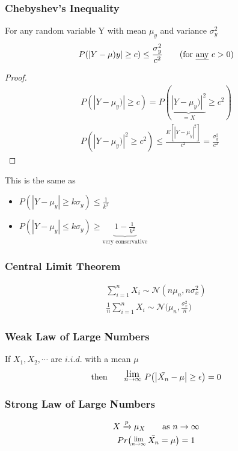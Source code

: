 \subsubsection*{Chebyshev's Inequality}
For any random variable Y with mean $\mu_y$ and variance $\sigma_y^2$
\begin{equation*}
	P(|Y - \mu)y| \geq c) \leq \frac{\sigma_y^2}{c^2} \tag{for \underline{any} $c > 0$}
\end{equation*}
\begin{proof}
	\begin{gather*}
		P(|Y - \mu_y)| \geq c) = P(\underbrace{|Y - \mu_y)|^2}_{=X} \geq c^2)\\
		P(|Y - \mu_y)|^2 \geq c^2) \leq \frac{E[|Y - \mu_y|^2]}{c^2} = \frac{\sigma_y^2}{c^2}
	\end{gather*}
\end{proof}
This is the same as
\begin{itemize}[label={--}]
	\item $P(|Y - \mu_y| \geq k \sigma_y) \leq \frac{1}{k^2}$
	\item $P(|Y - \mu_y| \leq k \sigma_y) \geq \underbrace{1- \frac{1}{k^2}}_{\text{very conservative}}$
\end{itemize}
\subsubsection*{Central Limit Theorem}
\begin{gather*}
	\sum\limits_{i=1}^n X_i \sim \mathcal{N}(n\mu_n, n\sigma_x^2)\\
	\frac{1}{n} \sum\limits_{i=1}^n X_i \sim \mathcal{N}\bigg(\mu_n, \frac{\sigma_x^2}{n}\bigg)
\end{gather*}
\subsubsection*{Weak Law of Large Numbers}
If $X_1, X_2, \cdots$ are $i.i.d.$ with a mean $\mu$
\begin{equation*}
	\text{then} \qquad \mathlarger{\mathlarger{\Lim{n \rightarrow \infty}}} {\large P}\big( \big| \bar{X_n} - \mu \big| \geq \epsilon \big) = 0
\end{equation*}
\subsubsection*{Strong Law of Large Numbers}
\begin{gather*}
	X \xrightarrow{p} \mu_X \qquad \text{as } n \rightarrow \infty\\
	Pr \big(\Lim{n\rightarrow \infty} \bar{X_n} = \mu \big) = 1
\end{gather*}